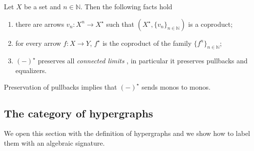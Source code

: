 \documentclass[a4paper,UKenglish,cleveref,pdftex,thm-restate,numberwithinsect]{lipics-v2021}
\newcommand{\lgh}{\mathsf{lg}}
\def\X{\textbf {\textup{X}}}
\begin{document}
\begin{proposition}\label{prop:fact}
	Let $X$ be a set and $n\in \mathbb{N}$. Then the following facts hold
	\begin{enumerate}
		\item there are arrows $v_{n}\colon X^n\to X^\star $ such that $(X^\star, \{v_{n}\}_{n\in \mathbb{N}})$ is a coproduct;
		\item for every arrow $f\colon X\to Y$, $f^\star$ is the coproduct of the family $\{f^n\}_{n\in \mathbb{N}}$;
		\item $(-)^\star$ preserves all \emph{connected limits} \cite{carboni1995connected}, in particular it preserves pullbacks and equalizers.
	\end{enumerate}
\end{proposition}

\begin{remark}\label{rem:mono}
	Preservation of pullbacks implies that $(-)^\star$ sends monos to monos.
\end{remark}


\subsection{The category of hypergraphs}

We open this section with the definition of hypergraphs and we show how to label them with an algebraic signature.  
\end{document}
